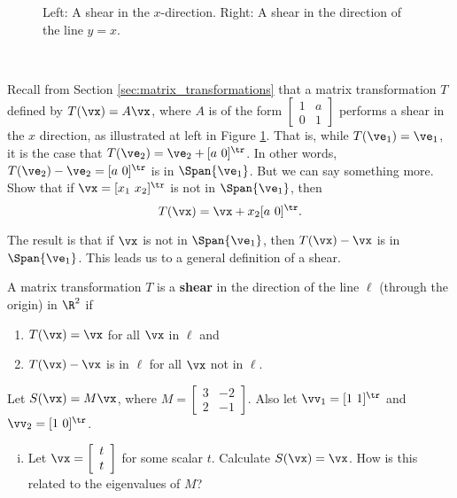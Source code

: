 \begin{figure}[ht]
\begin{center}
 \hspace{0.5in} 
\end{center}
\caption{Left: A shear in the $x$-direction. Right: A shear in the direction of the line $y=x$.}
\label{F:JCF_shear_1}
\end{figure}

\begin{activity} \label{act:JCF_shears} ~
\ba
\item Recall from Section \ref{sec:matrix_transformations} that a matrix transformation $T$ defined by $T(\vx) = A\vx$, where $A$ is of the form $\left[ \begin{array}{cc} 1&a\\0&1 \end{array} \right]$ performs a shear in the $x$ direction, as illustrated at left in Figure \ref{F:JCF_shear_1}. That is, while $T(\ve_1) = \ve_1$, it is the case that $T(\ve_2) = \ve_2 + [a \ 0]^{\tr}$. In other words, $T(\ve_2)-\ve_2 = [a \ 0]^{\tr}$ is in $\Span \{\ve_1\}$. But we can say something more. Show that if 
$\vx = [x_1 \ x_2]^{\tr}$ is not in $\Span \{\ve_1\}$, then 
\[T(\vx) = \vx + x_2[a \ 0]^{\tr}.\]

The result is that if $\vx$ is not in $\Span \{\ve_1\}$, then $T(\vx) - \vx$ is in $\Span \{\ve_1\}$. This leads us to a general definition of a shear.

\begin{definition} A matrix transformation $T$ is a \textbf{shear} in the direction of the line $\ell$ (through the origin) in $\R^2$ if
\begin{enumerate}
\item $T(\vx) = \vx$ for all $\vx$ in $\ell$ and 
\item $T(\vx) - \vx$ is in $\ell$ for all $\vx$ not in $\ell$.
\end{enumerate}
\end{definition}

\item Let $S(\vx) = M\vx$, where $M = \left[ \begin{array}{cr} 3&-2\\2&-1 \end{array} \right]$. Also let $\vv_1 = [1 \ 1]^{\tr}$ and $\vv_2 = [1 \ 0]^{\tr}$. 
	\begin{enumerate}[i.]
	\item Let $\vx = \left[ \begin{array}{c} t\\t \end{array} \right]$ for some scalar $t$. Calculate $S(\vx) = \vx$. How is this related to the eigenvalues of $M$?
	

\end{enumerate}
\end{activity}
